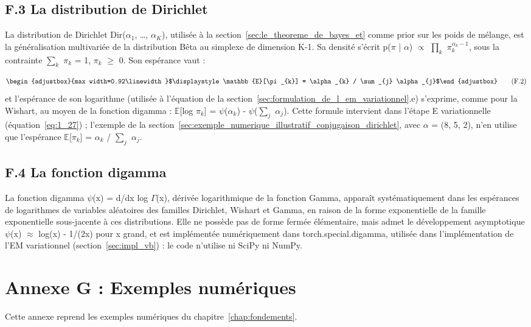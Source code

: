 \subsection*{F.3 La distribution de Dirichlet}
La distribution de Dirichlet Dir($\alpha _{1}$, \ldots{}, $\alpha_{K}$), utilisée à la section~\ref{sec:le_theoreme_de_bayes_et} comme prior sur les poids de mélange, est la généralisation multivariée de la distribution Bêta au simplexe de dimension K-1. Sa densité s'écrit p($\pi $ | $\alpha $) $\propto $ $\prod _{k}$ $\pi _{k}^{\alpha _{k}-1}$, sous la contrainte $\sum_{k}$ $\pi _{k}$ = 1, $\pi _{k}$ $\geq $ 0. Son espérance vaut :

\begin{equation}
\begin{adjustbox}{max width=0.92\linewidth}$\displaystyle \mathbb{E}[\pi _{k}] = \alpha _{k} / \sum_{j} \alpha _{j}$\end{adjustbox}
\tag{F.2}
\label{eq:G_2}
\end{equation}
et l'espérance de son logarithme (utilisée à l'équation de la section~\ref{sec:formulation_de_l_em_variationnel}.e) s'exprime, comme pour la Wishart, au moyen de la fonction digamma : $\mathbb{E}$[log $\pi _{k}$] = $\psi $($\alpha _{k}$) - $\psi $($\sum_{j}$ $\alpha _{j}$). Cette formule intervient dans l'étape E variationnelle (équation~\ref{eq:1_27}) ; l'exemple de la section~\ref{sec:exemple_numerique_illustratif_conjugaison_dirichlet}, avec $\alpha $ = (8, 5, 2), n'en utilise que l'espérance $\mathbb{E}$[$\pi _{k}$] = $\alpha _{k}$ / $\sum_{j}$ $\alpha _{j}$.

\subsection*{F.4 La fonction digamma}
La fonction digamma $\psi $(x) = d/dx log $\Gamma $(x), dérivée logarithmique de la fonction Gamma, apparaît systématiquement dans les espérances de logarithmes de variables aléatoires des familles Dirichlet, Wishart et Gamma, en raison de la forme exponentielle de la famille exponentielle sous-jacente à ces distributions. Elle ne possède pas de forme fermée élémentaire, mais admet le développement asymptotique $\psi $(x) $\approx $ log(x) - 1/(2x) pour x grand, et est implémentée numériquement dans torch.special.digamma, utilisée dans l'implémentation de l'EM variationnel (section~\ref{sec:impl_vb}) : le code n'utilise ni SciPy ni NumPy.

\section*{Annexe G : Exemples numériques}
Cette annexe reprend les exemples numériques du chapitre~\ref{chap:fondements}.
\setcounter{subsection}{0}\renewcommand{\thesubsection}{G.\arabic{subsection}}\renewcommand{\theHsubsection}{G.\arabic{subsection}}
\setcounter{table}{0}\renewcommand{\thetable}{G.\arabic{table}}\renewcommand{\theHtable}{G.\arabic{table}}
\setcounter{figure}{0}\renewcommand{\thefigure}{G.\arabic{figure}}\renewcommand{\theHfigure}{G.\arabic{figure}}

